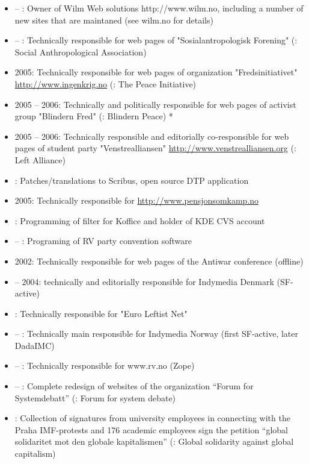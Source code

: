 \begin{itemize}
\item {} – : Owner of Wilm Web solutions http://www.wilm.no, including a number of new sites that are maintaned (see wilm.no for details)
\item {} – : Technically responsible for web pages of "Sosialantropologisk Forening" (\english: Social Anthropological Association)
\item 2005: Technically responsible for web pages of organization "Fredsinitiativet" \href{http://www.ingenkrig.no}{http://www.ingenkrig.no} (\english: The Peace Initiative)
\item 2005 – 2006: Technically and politically responsible for web pages of activist group "Blindern Fred" (\english: Blindern Peace) *
\item 2005 – 2006: Technically responsible and editorially co-responsible for web pages of student party "Venstrealliansen" \href{http://www.venstrealliansen.org}{http://www.venstrealliansen.org} (\english: Left Alliance)
\item {}: Patches/translations to Scribus, open source DTP application
\item 2005: Technically responsible for \href{http://www.pensjonsomkamp.no}{http://www.pensjonsomkamp.no}
\item {}: Programming of filter for Koffice and holder of KDE CVS account
\item {} – : Programing of RV party convention software
\item 2002: Technically responsible for web pages of the Antiwar conference (offline)
\item {} – 2004: technically and editorially responsible for Indymedia Denmark (SF-active)
\item {}: Technically responsible for "Euro Leftist Net"
\item {} – : Technically main responsible for Indymedia Norway (first SF-active, later DadaIMC)
\item {} – : Technically responsible for www.rv.no (Zope)
\item \December – : Complete redesign of websites of the organization “Forum for Systemdebatt” (\english: Forum for system debate)
\item {}: Collection of signatures from university employees in connecting with the Praha IMF-protests and 176 academic employees sign the petition “global solidaritet mot den globale kapitalismen” (\english: Global solidarity against global capitalism)

\end{itemize}
